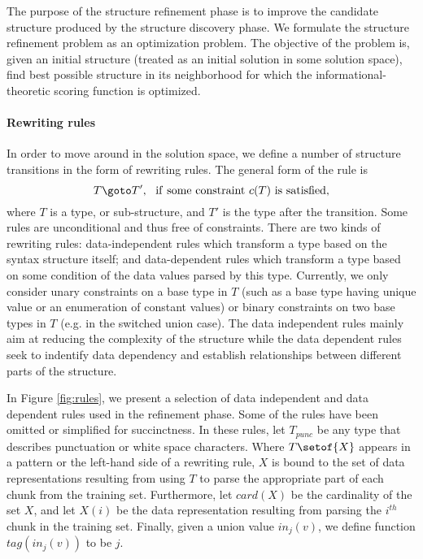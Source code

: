 The purpose of the structure refinement phase is to improve
the candidate structure produced by the structure discovery phase. We
formulate the structure refinement problem as an optimization problem. The
objective of the problem is, given an initial structure (treated as
an initial solution in some solution space), find best possible structure
in its neighborhood for which the informational-theoretic scoring function
is optimized.

\paragraph*{Rewriting rules}
In order to move around in the solution space, we define a number of structure
transitions in the form of rewriting rules. The general form of the rule is
\[T \goto T', ~~ {\rm if~ some~ constraint~} c(T)~ {\rm is~ satisfied,}\]
where $T$ is a type, or sub-structure, and $T'$ is the type after the
transition.  Some rules are unconditional and thus free of constraints.
There are two kinds of rewriting rules: data-independent rules which
transform a type based on the syntax structure itself; and data-dependent
rules which transform a type based on some condition of the data values
parsed by this type. Currently, we only consider unary constraints on a base
type in $T$ (such as a base type having unique value or an enumeration of constant
values) or binary constraints on two base types in $T$ (e.g. in the switched
union case). The data independent rules mainly aim at reducing the complexity
of the structure while the data dependent rules seek to indentify data
dependency and establish relationships between different parts 
of the structure.

In Figure \ref{fig:rules}, we present a selection of
data independent and data dependent rules used in the refinement phase.
Some of the rules have been omitted or simplified for succinctness.
In these rules,
let $T_{punc}$ be any type that describes punctuation or white space characters.
Where $T\setof{X}$ appears in a pattern or the left-hand side of a rewriting
rule, $X$ is bound to the set of data representations resulting
from using $T$ to parse the appropriate part of each chunk from the training
set. Furthermore, let $card(X)$ be the cardinality of the set $X$, 
and let $X(i)$ be the data representation resulting
from parsing the $i^{th}$ chunk in the training set. Finally, given a union
value $in_j(v)$, we define function $tag(in_j(v))$ to be $j$.

